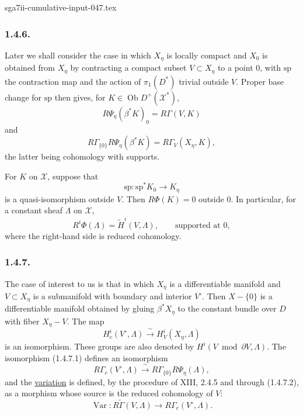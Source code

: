 \begin{filecontents*}{sga7ii-cumulative-input-047.tex}
\subsubsection*{1.4.6.}
Later we shall consider the case in which $X_\eta$ is locally compact
and $X_0$ is obtained from $X_\eta$ by contracting a compact subset
$V\subset X_\eta$ to a point $0$, with $\mathrm{sp}$ the contraction
map and the action of $\pi_1(D^*)$ trivial outside $V$.  Proper base
change for $\mathrm{sp}$ then gives, for
$K\in\operatorname{Ob}D^+(\mathcal X^*)$,
\begin{equation}\tag{1.4.6.1}
R\Psi_\eta(\beta^*K)_0=R\Gamma(V,K)
\end{equation}
and
\begin{equation}\tag{1.4.6.2}
R\Gamma_{\{0\}}R\Psi_\eta(\beta^*K)
=R\Gamma_V(X_\eta,K),
\end{equation}
the latter being cohomology with supports.

For $K$ on $\mathcal X$, suppose that
\[
\mathrm{sp}:\mathrm{sp}^*K_0\longrightarrow K_\eta
\]
is a quasi-isomorphism outside $V$.  Then $R\Phi(K)=0$ outside $0$.
In particular, for a constant sheaf $\Lambda$ on $\mathcal X$,
\[
R^i\Phi(\Lambda)=\widetilde H^i(V,\Lambda),
\qquad\text{supported at }0,
\]
where the right-hand side is reduced cohomology.

\subsubsection*{1.4.7.}
The case of interest to us is that in which $X_\eta$ is a
differentiable manifold and $V\subset X_\eta$ is a submanifold with
boundary and interior $V^\circ$.  Then $X-\{0\}$ is a differentiable
manifold obtained by gluing $\beta^*X_\eta$ to the constant bundle
over $D$ with fiber $X_\eta-V$.  The map
\begin{equation}\tag{1.4.7.1}
H_c^i(V^\circ,\Lambda)
\xrightarrow{\ \sim\ }H_V^i(X_\eta,\Lambda)
\end{equation}
is an isomorphism.  These groups are also denoted by
$H^i(V\bmod\partial V,\Lambda)$.  The isomorphism (1.4.7.1) defines
an isomorphism
\begin{equation}\tag{1.4.7.2}
R\Gamma_c(V^\circ,\Lambda)
\xrightarrow{\ \sim\ }
R\Gamma_{\{0\}}R\Psi_\eta(\Lambda),
\end{equation}
and the \underline{variation} is defined, by the procedure of XIII,
2.4.5 and through (1.4.7.2), as a morphism whose source is the reduced
cohomology of $V$:
\begin{equation}\tag{1.4.7.3}
\operatorname{Var}:
R\widetilde\Gamma(V,\Lambda)
\longrightarrow R\Gamma_c(V^\circ,\Lambda).
\end{equation}


\end{filecontents*}
